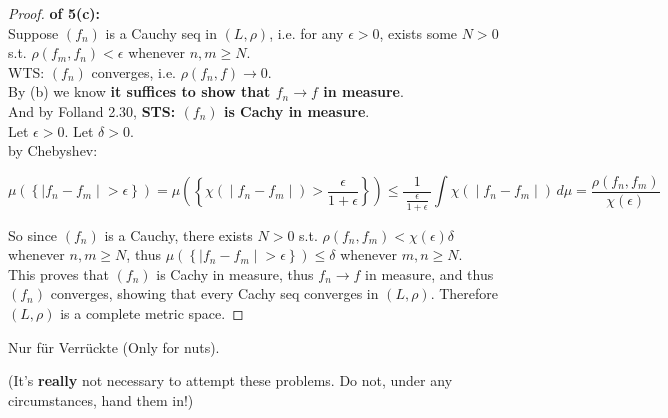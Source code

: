 \documentclass{qlnotes-export}
\begin{document}
\begin{proof}

\textbf{of 5(c):}\\
Suppose \((f_{n})\) is a Cauchy seq in \((L,\rho)\), i.e. for any \(\epsilon > 0\), exists some \(N > 0\) s.t. \(\rho(f_{m},f_{n}) < \epsilon\) whenever \(n,m \geq N\).\\
WTS: \((f_{n})\) converges, i.e. \(\rho(f_{n},f)\rightarrow 0\).\\
By (b) we know \textbf{it suffices to show that \(f_{n}\rightarrow f\) in measure}.\\
And by Folland 2.30, \textbf{STS: \((f_{n})\) is Cachy in measure}.\\
Let \(\epsilon > 0\). Let \(\delta > 0\).\\
by Chebyshev:

\[\left. \mu(\left\{ |f_{n} - f_{m} \middle| > \epsilon \right\}) = \mu(\left\{ \chi( \middle| f_{n} - f_{m} \middle| ) > \frac{\epsilon}{1 + \epsilon} \right\}) \leq \frac{1}{\,\frac{\epsilon}{1 + \epsilon}\,}\int\chi( \middle| f_{n} - f_{m} \middle| )\, d\mu = \frac{\rho(f_{n},f_{m})}{\chi(\epsilon)} \right.\]

So since \((f_{n})\) is a Cauchy, there exists \(N > 0\) s.t. \(\rho(f_{n},f_{m}) < \chi(\epsilon)\delta\) whenever \(n,m \geq N\), thus \(\mu(\left\{ |f_{n} - f_{m} \middle| > \epsilon \right\}) \leq \delta\) whenever \(m,n \geq N\).\\
This proves that \((f_{n})\) is Cachy in measure, thus \(f_{n}\rightarrow f\) in measure, and thus \((f_{n})\) converges, showing that every Cachy seq converges in \((L,\rho)\). Therefore \((L,\rho)\) is a complete metric space.

\end{proof}

Nur für Verrückte (Only for nuts).

(It's \textbf{really} not necessary to attempt these problems. Do not, under any circumstances, hand them in!)
\end{document}
